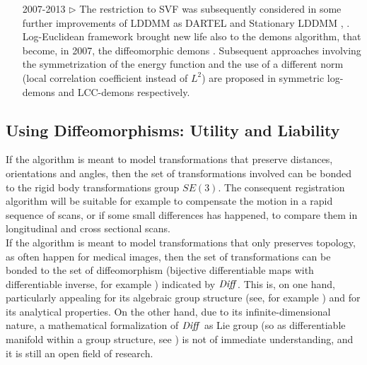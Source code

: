 \begin{enumerate}
	\item[2007-2013 $\triangleright$] The restriction to SVF was subsequently considered in some further improvements of LDDMM  as DARTEL and Stationary LDDMM \cite{Ashburner:07}, \cite{hernandez2007registration}. 
	Log-Euclidean framework brought new life also to the demons algorithm, that  become, in 2007, the diffeomorphic demons \cite{vercauteren2007non}.
	Subsequent approaches involving the symmetrization of the energy function and the use of a different norm (local correlation coefficient instead of $L^{2}$) are proposed in symmetric log-demons \cite{vercauteren08} and LCC-demons \cite{lorenzi2013lcc} respectively.
	
\end{enumerate}


\subsection{Using Diffeomorphisms: Utility and Liability}\label{se:diffe_util_and_liab}

If the algorithm is meant to model transformations that preserve distances, orientations and angles, then the set of transformations involved can be bonded to the rigid body transformations group $SE(3)$. The consequent registration algorithm will be suitable for example to compensate the motion in a rapid sequence of scans, or if some small differences has happened, to compare them in longitudinal and cross sectional scans.\\

If the algorithm is meant to model transformations that only preserves topology, as often happen for medical images, then the set of transformations can be bonded to the set of diffeomorphism (bijective differentiable maps with differentiable inverse, for example \cite{lee2012introduction}) indicated by $\text{\emph{Diff}}$. This is, on one hand, particularly appealing for its algebraic group structure (see, for example \cite{artin2011algebra}) and for its analytical properties. On the other hand, due to its infinite-dimensional nature, a mathematical formalization of $\text{\emph{Diff}}$ as Lie group (so as differentiable manifold within a group structure, see \cite{warner}) is not of immediate understanding, and it is still an open field of research.\\

